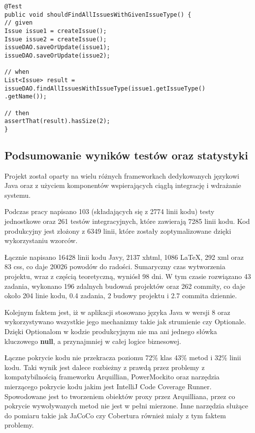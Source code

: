 \begin{lstlisting}[caption={Przykład testu integracyjnego}, label=lis:integ, numbers=none]
@Test
public void shouldFindAllIssuesWithGivenIssueType() {
// given
Issue issue1 = createIssue();
Issue issue2 = createIssue();
issueDAO.saveOrUpdate(issue1);
issueDAO.saveOrUpdate(issue2);

// when
List<Issue> result = issueDAO.findAllIssuesWithIssueType(issue1.getIssueType()
.getName());

// then
assertThat(result).hasSize(2);
}\end{lstlisting}


\subsection{Podsumowanie wyników testów oraz statystyki}
Projekt został oparty na wielu różnych frameworkach dedykowanych językowi Java oraz z użyciem komponentów wspierających ciągłą integrację i wdrażanie systemu.

Podczas pracy napisano 103 (składających się z 2774 linii kodu) testy jednostkowe oraz 261 testów integracyjnych, które zawierają 7285 linii kodu. Kod produkcyjny jest złożony z 6349 linii, które zostały zoptymalizowane dzięki wykorzystaniu wzorców. 

Łącznie napisano 16428 linii kodu Javy, 2137 xhtml, 1086 \LaTeX, 292 xml oraz 83 css, co daje 20026 powodów do radości.  Sumaryczny czas wytworzenia projektu, wraz z częścią teoretyczną, wyniósł 98 dni. W tym czasie rozwiązano 43 zadania, wykonano 196 zdalnych budowań projektów oraz 262 commity, co daje około 204 linie kodu, 0.4 zadania, 2 budowy projektu i 2.7 commita dziennie.

Kolejnym faktem jest, iż w aplikacji stosowano języka Java w wersji 8 oraz wykorzystywano wszystkie jego mechanizmy takie jak strumienie czy Optionale. Dzięki Optionalom w kodzie produkcyjnym nie ma ani jednego słówka kluczowego \textbf{null}, a przynajmniej w całej logice biznesowej.

Łączne pokrycie kodu nie przekracza poziomu 72\% klas 43\% metod i 32\% linii kodu. Taki wynik jest dalece rozbieżny z prawdą przez problemy z kompatybilnością frameworku Arquillian, PowerMockito oraz narzędzia mierzącego pokrycie kodu jakim jest IntelliJ Code Coverage Runner. Spowodowane jest to tworzeniem obiektów proxy przez Arquilliana, przez co pokrycie wywoływanych metod nie jest w pełni mierzone. Inne narzędzia służące do pomiaru takie jak JaCoCo czy Cobertura również miały z tym faktem problemy.
